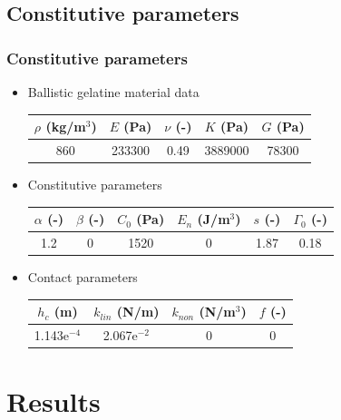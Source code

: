 \documentclass{beamer}
\begin{document}
\subsection{Constitutive parameters}
\begin{frame}
\frametitle{Constitutive parameters}
\begin{itemize}
\item Ballistic gelatine material data
\begin{center}
\begin{tabular}{c|c|c|c|c}
$\rho$ (kg/m$^\mathrm{3}$) & $E$ (Pa) & $\nu$ (-) & $K$ (Pa) & $G$ (Pa) \\
\hline
860 & 233300 & 0.49 & 3889000 & 78300
\end{tabular}
\end{center}
\vspace{5mm}
\item Constitutive parameters
\begin{center}
\begin{tabular}{c|c|c|c|c|c}
$\alpha$ (-) & $\beta$ (-) & $C_0$ (Pa) & $E_n$ (J/m$^\mathrm{3}$) & $s$ (-) & $\Gamma_0$ (-) \\
\hline
1.2 & 0 & 1520 & 0 & 1.87 & 0.18
\end{tabular}
\end{center}
\vspace{5mm}
\item Contact parameters
\begin{center}
\begin{tabular}{c|c|c|c}
$h_c$ (m) & $k_{lin}$ (N/m) & $k_{non}$ (N/m$^\mathrm{3}$) & $f$ (-) \\
\hline
1.143e$^\mathrm{-4}$ & 2.067e$^\mathrm{-2}$ & 0 & 0 \\
\end{tabular}
\end{center}
\end{itemize}
\end{frame}

\section{Results}
\end{document}
